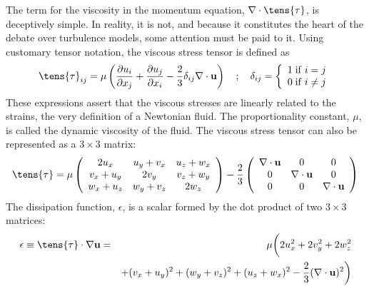\documentclass[graybox]{svmult}
\begin{document}
The term for the viscosity in the momentum equation, $\nabla \cdot \tens{\tau}$, is deceptively simple. In reality, it is not, and because it constitutes the heart of the debate over turbulence models, some attention must be paid to it. Using customary tensor notation, the viscous stress tensor is defined as
\begin{equation}
\tens{\tau}_{ij} = \mu \left( \frac{\partial u_i}{\partial x_j} + \frac{\partial u_j}{\partial x_i} - \frac{2}{3} \delta_{ij} \nabla \cdot \mathbf{u} \right) \quad ; \quad \delta_{ij} = \left\{ \begin{array}{l} 1 \; \mathrm{if} \; i=j \\ 0 \; \mathrm{if} \; i\neq j \end{array} \right.
\end{equation}
These expressions assert that the viscous stresses are linearly related to the strains, the very definition of a Newtonian fluid. The proportionality constant, $\mu$, is called the dynamic viscosity of the fluid. The viscous stress tensor can also be represented as a $3 \times 3$ matrix:
\begin{equation}
\tens{\tau} = \mu \left( \begin{array}{ccc} 2u_x & u_y+v_x & u_z+w_x \\ v_x+u_y & 2v_y & v_z+w_y \\ w_x+u_z & w_y+v_z & 2w_z \end{array} \right) -
              \frac{2}{3} \left( \begin{array}{ccc} \nabla \cdot \mathbf{u} & 0 & 0 \\ 0 & \nabla \cdot \mathbf{u} & 0 \\ 0 & 0 & \nabla \cdot \mathbf{u} \end{array} \right)
\end{equation}
The dissipation function, $\epsilon$, is a scalar formed by the dot product of two $3 \times 3$ matrices:
\begin{eqnarray}
  \epsilon \equiv \tens{\tau} \cdot \nabla \mathbf{u} &=& \mu \bigg( 2u_x^2 + 2v_y^2 + 2w_z^2   \nonumber \\
  && + (v_x+u_y)^2 + (w_y+v_z)^2 + (u_z+w_x)^2 - \frac{2}{3} (\nabla \cdot \mathbf{u})^2 \bigg)
\end{eqnarray}
\end{document}
